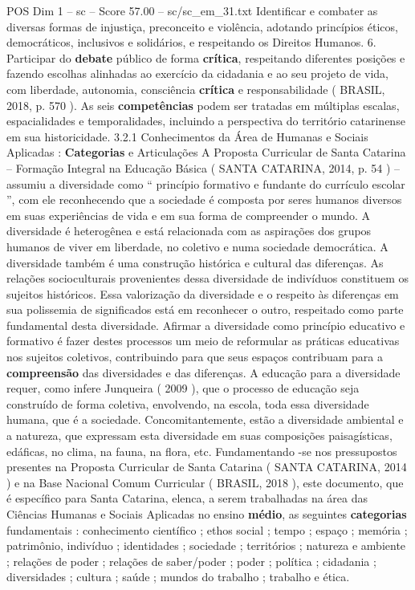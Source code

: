\begin{textsample}{POS Dim 1 – sc – Score 57.00 – sc/sc\_em\_31.txt}
Identificar e combater as diversas formas de injustiça, preconceito e violência, adotando princípios éticos, democráticos, inclusivos e solidários, e respeitando os Direitos Humanos. 6.
Participar do \textbf{debate} público de forma \textbf{crítica}, respeitando diferentes posições e fazendo escolhas alinhadas ao exercício da cidadania e ao seu projeto de vida, com liberdade, autonomia, consciência \textbf{crítica} e responsabilidade ( BRASIL, 2018, p. 570 ).
As seis \textbf{competências} podem ser tratadas em múltiplas escalas, espacialidades e temporalidades, incluindo a perspectiva do território catarinense em sua historicidade. 3.2.1 Conhecimentos da Área de Humanas e Sociais Aplicadas : \textbf{Categorias} e Articulações A Proposta Curricular de Santa Catarina – Formação Integral na Educação Básica ( SANTA CATARINA, 2014, p. 54 ) – assumiu a diversidade como “ princípio formativo e fundante do currículo escolar ”, com ele reconhecendo que a sociedade é composta por seres humanos diversos em suas experiências de vida e em sua forma de compreender o mundo.
A diversidade é heterogênea e está relacionada com as aspirações dos grupos humanos de viver em liberdade, no coletivo e numa sociedade democrática.
A diversidade também é uma construção histórica e cultural das diferenças.
As relações socioculturais provenientes dessa diversidade de indivíduos constituem os sujeitos históricos.
Essa valorização da diversidade e o respeito às diferenças em sua polissemia de significados está em reconhecer o outro, respeitado como parte fundamental desta diversidade.
Afirmar a diversidade como princípio educativo e formativo é fazer destes processos um meio de reformular as práticas educativas nos sujeitos coletivos, contribuindo para que seus espaços contribuam para a \textbf{compreensão} das diversidades e das diferenças.
A educação para a diversidade requer, como infere Junqueira ( 2009 ), que o processo de educação seja construído de forma coletiva, envolvendo, na escola, toda essa diversidade humana, que é a sociedade.
Concomitantemente, estão a diversidade ambiental e a natureza, que expressam esta diversidade em suas composições paisagísticas, edáficas, no clima, na fauna, na flora, etc.
Fundamentando -se nos pressupostos presentes na Proposta Curricular de Santa Catarina ( SANTA CATARINA, 2014 ) e na Base Nacional Comum Curricular ( BRASIL, 2018 ), este documento, que é específico para Santa Catarina, elenca, a serem trabalhadas na área das Ciências Humanas e Sociais Aplicadas no ensino \textbf{médio}, as seguintes \textbf{categorias} fundamentais : conhecimento científico ; ethos social ; tempo ; espaço ; memória ; patrimônio, indivíduo ; identidades ; sociedade ; territórios ; natureza e ambiente ; relações de poder ; relações de saber/poder ; poder ; política ; cidadania ; diversidades ; cultura ; saúde ; mundos do trabalho ; trabalho e ética.

\end{textsample}
